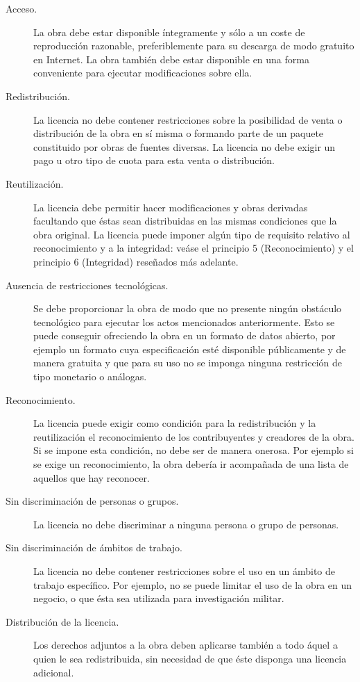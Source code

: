 \begin{description}
 \item [Acceso.] La obra debe estar disponible íntegramente y sólo a un coste de 
  reproducción razonable, preferiblemente para su descarga de modo gratuito en Internet. 
  La obra también debe estar disponible en una forma conveniente para ejecutar modificaciones sobre ella.
 \item [Redistribución.] La licencia no debe contener restricciones sobre la posibilidad de venta o 
  distribución de la obra en sí misma o formando parte de un paquete constituido por obras de fuentes diversas. 
  La licencia no debe exigir un pago u otro tipo de cuota para esta venta o distribución.
 \item [Reutilización.] La licencia debe permitir hacer modificaciones y obras derivadas facultando que éstas sean distribuidas en las mismas condiciones que la obra original. La licencia puede imponer algún tipo de requisito relativo al 
  reconocimiento y a la integridad: veáse el principio 5 (Reconocimiento) y el principio 6 (Integridad) reseñados más adelante.
 \item [Ausencia de restricciones tecnológicas.] Se debe proporcionar la obra de modo que no presente ningún obstáculo tecnológico para ejecutar los actos mencionados anteriormente. Esto se puede conseguir ofreciendo la obra en un formato de datos abierto, por ejemplo un formato cuya especificación esté disponible públicamente y de manera gratuita y que para su uso no se imponga ninguna restricción de tipo monetario o análogas.
 \item [Reconocimiento.] La licencia puede exigir como condición para la redistribución y la reutilización el reconocimiento de los contribuyentes y creadores de la obra. Si se impone esta condición, no debe ser de manera onerosa. Por ejemplo si se exige un reconocimiento, la obra debería ir acompañada de una lista de aquellos que hay reconocer.
 \item [Sin discriminación de personas o grupos.] La licencia no debe discriminar a ninguna persona o grupo de personas.
 \item [Sin discriminación de ámbitos de trabajo.] La licencia no debe contener restricciones sobre el uso en un ámbito de trabajo específico. Por ejemplo, no se puede limitar el uso de la obra en un negocio, o que ésta sea utilizada para investigación militar.
 \item [Distribución de la licencia.] Los derechos adjuntos a la obra deben aplicarse también a todo áquel a quien le sea redistribuida, sin necesidad de que éste disponga una licencia adicional.

\end{description}

